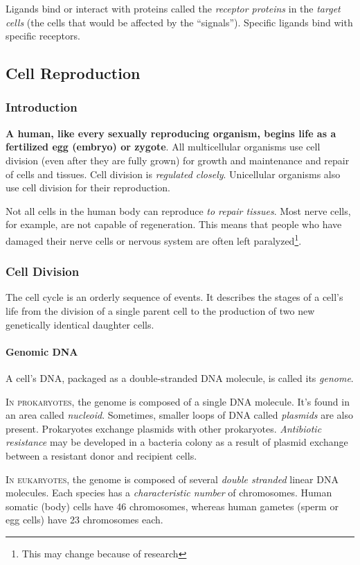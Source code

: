 \documentclass[12pt]{article}
\begin{document}
Ligands bind or interact with proteins called the \emph{receptor proteins} in the \emph{target cells} (the cells that would be affected by the ``signals''). Specific ligands bind with specific receptors. 

\subsection{Cell Reproduction}
\subsubsection{Introduction}
\textbf{A human, like every sexually reproducing organism, begins life as a fertilized egg (embryo) or zygote}. All multicellular organisms use cell division (even after they are fully grown) for growth and maintenance and repair of cells and tissues. Cell division is \emph{regulated closely}. Unicellular organisms also use cell division for their reproduction. 

Not all cells in the human body can reproduce \emph{to repair tissues}. Most nerve cells, for example, are not capable of regeneration. This means that people who have damaged their nerve cells or nervous system are often left paralyzed\footnote{This may change because of research}.
\subsubsection{Cell Division}
The cell cycle is an orderly sequence of events. It describes the stages of a cell's life from the division of a single parent cell to the production of two new genetically identical daughter cells.
\paragraph{Genomic DNA}
A cell's DNA, packaged as a double-stranded DNA molecule, is called its \emph{genome}. 

\lettrine[lines=2]{I}{n prokaryotes}, the genome is composed of a single DNA molecule. It's found in an area called \emph{nucleoid}. Sometimes, smaller loops of DNA called \emph{plasmids} are also present. Prokaryotes exchange plasmids with other prokaryotes. \emph{Antibiotic resistance} may be developed in a bacteria colony as a result of plasmid exchange between a resistant donor and recipient cells.

\lettrine[lines=2]{I}{n eukaryotes}, the genome is composed of several \emph{double stranded} linear DNA molecules. Each species has a \emph{characteristic number} of chromosomes. Human somatic (body) cells have 46 chromosomes, whereas human gametes (sperm or egg cells) have 23 chromosomes each.
\end{document}
